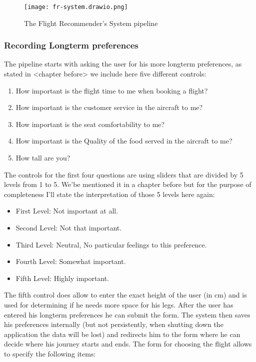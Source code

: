 \documentclass[a4paper]{article}
\begin{document}
\begin{figure}[h]
    \centering
    \texttt{[image: fr-system.drawio.png]}
    \caption{The Flight Recommender's System pipeline}
    \label{fig:pipeline}
\end{figure}

\subsubsection{Recording Longterm preferences}

The pipeline starts with asking the user for his more longterm preferences, as stated in <chapter before> we include here five different controls:

\begin{enumerate}
    \item How important is the flight time to me when booking a flight?
    \item How important is the customer service in the aircraft to me?
    \item How important is the seat comfortability to me?
    \item How important is the Quality of the food served in the aircraft to me?
    \item How tall are you?
\end{enumerate}

The controls for the first four questions are using sliders that are divided by 5 levels from 1 to 5. We'be mentioned it in a chapter before but for the purpose of completeness I'll state the interpretation of those 5 levels here again:

\begin{itemize}
    \item First Level: Not important at all.
    \item Second Level: Not that important.
    \item Third Level: Neutral, No particular feelings to this preference.
    \item Fourth Level: Somewhat important.
    \item Fifth Level: Highly important.
\end{itemize}

The fifth control does allow to enter the exact height of the user (in cm) and is used for determining if he needs more space for his legs. After the user has entered his longterm preferences he can submit the form. The system then saves his preferences internally (but not persistently, when shutting down the application the data will be lost) and redirects him to the form where he can decide where his journey starts and ends. The form for choosing the flight allows to specify the following items:
\end{document}
